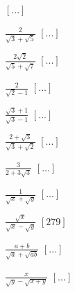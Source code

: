 \begin{esercizio}
\begin{multicols}{4}
\begin{enumeratea}
  \hfill \(\left[...\right]\)
 \item \(\frac 2{\sqrt 3+\sqrt 5}\)
  \hfill \(\left[...\right]\)
 \item \(\frac{2\sqrt 2}{\sqrt 5+\sqrt 7}\)
  \hfill \(\left[...\right]\)
 \item \(\frac 2{\sqrt 2-1}\)
  \hfill \(\left[...\right]\)
 \item \(\frac{\sqrt 3+1}{\sqrt 3-1}\)
  \hfill \(\left[...\right]\)
 \item \(\frac{2+\sqrt 3}{\sqrt 3+\sqrt 2}\)
  \hfill \(\left[...\right]\)
 \item \(\frac 3{2+3\sqrt 3}\)
  \hfill \(\left[...\right]\)
 \item \(\frac 1{\sqrt x+\sqrt y}\)
  \hfill \(\left[...\right]\)
 \item \(\frac{\sqrt x}{\sqrt x-\sqrt y}\)
  \hfill \(\left[279\right]\)
 \item \(\frac{a+b}{\sqrt a+\sqrt{ab}}\)
  \hfill \(\left[...\right]\)
 \item \(\frac x{\sqrt y-\sqrt{x+y}}\)
  \hfill \(\left[...\right]\)
 \end{enumeratea}
 \end{multicols}
\end{esercizio}


